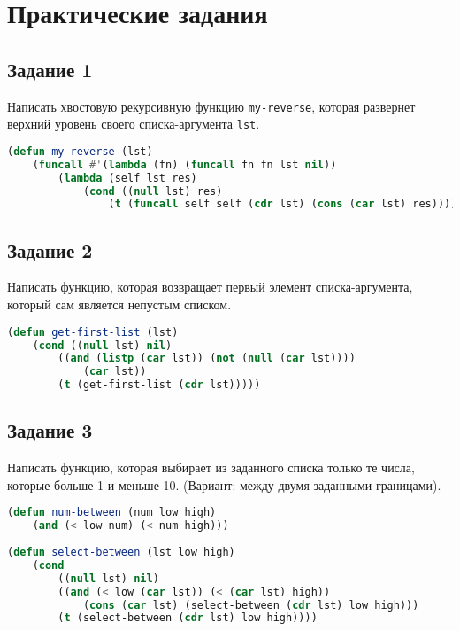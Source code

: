 \chapter{Практические задания}

\section{Задание 1}

Написать хвостовую рекурсивную функцию \texttt{my-reverse}, которая развернет верхний
уровень своего списка-аргумента \texttt{lst}.

\begin{lstlisting}[language=Lisp]
(defun my-reverse (lst)
	(funcall #'(lambda (fn) (funcall fn fn lst nil))
		(lambda (self lst res)
			(cond ((null lst) res)
				(t (funcall self self (cdr lst) (cons (car lst) res)))))))
\end{lstlisting}

\section{Задание 2}

Написать функцию, которая возвращает первый элемент списка-аргумента, который сам является непустым списком.

\begin{lstlisting}[language=Lisp]
(defun get-first-list (lst)
	(cond ((null lst) nil)
		((and (listp (car lst)) (not (null (car lst))))
			(car lst))
		(t (get-first-list (cdr lst)))))
\end{lstlisting}

\section{Задание 3}

Написать функцию, которая выбирает из заданного списка только те числа, которые больше 1 и меньше 10.
(Вариант: между двумя заданными границами).

\begin{lstlisting}[language=Lisp]
(defun num-between (num low high)
	(and (< low num) (< num high)))
	
(defun select-between (lst low high)
	(cond
		((null lst) nil)
		((and (< low (car lst)) (< (car lst) high))
			(cons (car lst) (select-between (cdr lst) low high)))
		(t (select-between (cdr lst) low high))))
\end{lstlisting}

\clearpage

